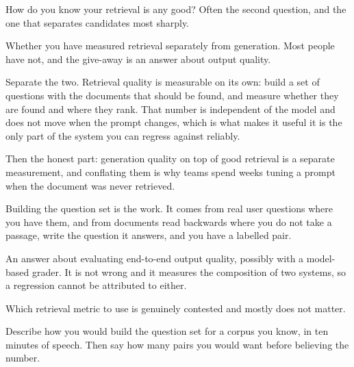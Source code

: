 \begin{bankq}{How do you know your retrieval is any good?}
\qasked
Often the second question, and the one that separates candidates most sharply.

\qtested
Whether you have measured retrieval separately from generation. Most people
have not, and the give-away is an answer about output quality.

\qstaff
Separate the two. Retrieval quality is measurable on its own: build a set of
questions with the documents that should be found, and measure whether they
are found and where they rank. That number is independent of the model and does
not move when the prompt changes, which is what makes it useful \dash{} it is
the only part of the system you can regress against reliably.

Then the honest part: generation quality on top of good retrieval is a separate
measurement, and conflating them is why teams spend weeks tuning a prompt when
the document was never retrieved. 

Building the question set is the work. It comes from real user questions where
you have them, and from documents read backwards where you do not \dash{} take
a passage, write the question it answers, and you have a labelled pair.

\qsenior
An answer about evaluating end-to-end output quality, possibly with a
model-based grader. It is not wrong and it measures the composition of two
systems, so a regression cannot be attributed to either.

\qcontested
Which retrieval metric to use is genuinely contested and mostly does not
matter. 

\qdrill
Describe how you would build the question set for a corpus you know, in ten
minutes of speech. Then say how many pairs you would want before believing the
number.
\end{bankq}

